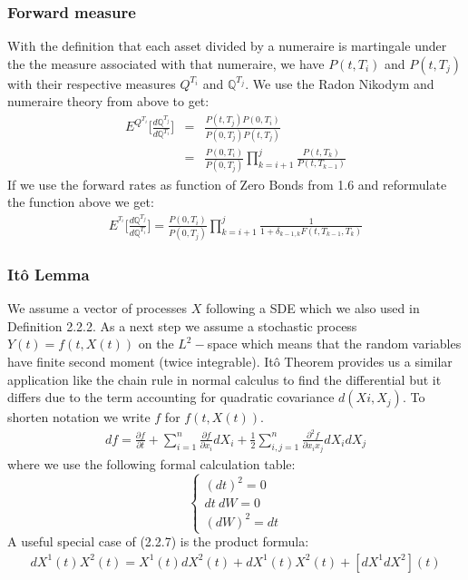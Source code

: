 \documentclass[11pt]{article}
\numberwithin{equation}{subsection}
\begin{document}
\subsubsection{Forward measure}		
With the definition that each asset divided by a numeraire is martingale under the the measure associated with that numeraire, we have \(P(t, T_i)\) and \(P(t, T_j)\) with their respective measures \(Q^{T_i}\) and \(\mathbb{Q}^{T_j}\). We use the Radon Nikodym and numeraire theory from above to get:
\begin{eqnarray*}
	E^{Q^{T_i}}\bigg[\frac{d\mathbb{Q}^{T_j}}{d\mathbb{Q}^{T_i}}\bigg] &=& \frac{P(t, T_j) P(0, T_i)}{P(0, T_j) P(t, T_j)} \\
	&=& \frac{P(0, T_i)}{P(0, T_j)} \displaystyle \prod_{k=i+1}^{j} \frac{P(t, T_{k})}{P(t, T_{k-1})}
\end{eqnarray*}
If we use the forward rates as function of Zero Bonds from 1.6 and reformulate the function above we get:
\begin{eqnarray}
E^{^{T_i}} \bigg[\frac{d\mathbb{Q}^{T_j}}{d\mathbb{Q}^{T_i}} \bigg] = \frac{P(0, T_i)}{P(0, T_j)} \prod_{k=i+1}^{j} \frac{1}{1+\delta_{k-1, k} F(t, T_{k-1}, T_{k})}
\end{eqnarray}
\subsubsection{It\^{o} Lemma}		
We assume a vector of processes \(X\) following a SDE which we also used in Definition 2.2.2. As a next step we assume a stochastic process \(Y(t)= f(t, X(t))\) on the \(L^2-\)space which means that the random variables have finite second moment (twice integrable). It\^{o} Theorem provides us a similar application like the chain rule in normal calculus to find the differential but it differs due to the term accounting for quadratic covariance 
\(d(Xi, X_j)\). To shorten notation we write \(f\) for \(f(t, X(t))\).
\begin{eqnarray}
	df = \frac{\partial f}{\partial t} + \sum_{i=1}^{n} \frac{\partial f}{\partial x_i} dX_i + \frac{1}{2} \sum_{i, j=1}^{n} \frac{\partial^2 f}{\partial x_i x_j} dX_i dX_j
\end{eqnarray}
where we use the following formal calculation table:
\begin{displaymath}
\left\{\begin{array}{lll}
(dt)^2 = 0 \\
dt\ dW = 0 \\
(dW)^2 = dt
\end{array} \right.
\end{displaymath}
A useful special case of (2.2.7) is the product formula:
\begin{eqnarray*}
	dX^{1}(t)X^{2}(t) = X^{1}(t)dX^{2}(t) + dX^{1}(t)X^{2}(t) + [dX^{1}dX^{2}](t)
\end{eqnarray*}
\end{document}
